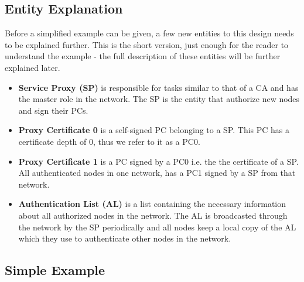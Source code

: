 \subsection{Entity Explanation}
Before a simplified example can be given, a few new entities to this design
needs to be explained further. This is the short version, just enough for the
reader to understand the example - the full description of these entities will
be further explained later.

\begin{itemize}
  \item \textbf{Service Proxy (SP)} is responsible for tasks similar to that of
  	a \ac{CA} and has the master role in the network. The \ac{SP} is the entity
  	that authorize new nodes and sign their \ac{PC}s.
  \item \textbf{Proxy Certificate 0} is a self-signed \ac{PC} belonging to a
  	\ac{SP}. This \ac{PC} has a certificate depth of 0, thus we refer to it as a
  	\ac{PC0}.
  \item \textbf{Proxy Certificate 1} is a \ac{PC} signed by a \ac{PC0} i.e. the
  	the certificate of a \ac{SP}. All authenticated nodes in one network, has a
  	\ac{PC1} signed by a \ac{SP} from that network.
  \item \textbf{Authentication List (AL)} is a list containing the necessary
  	information about all authorized nodes in the network. The \ac{AL} is
  	broadcasted through the network by the \ac{SP} periodically and all nodes
  	keep a local copy of the \ac{AL} which they use to authenticate other nodes
  	in the network.
\end{itemize}

\subsection{Simple Example}